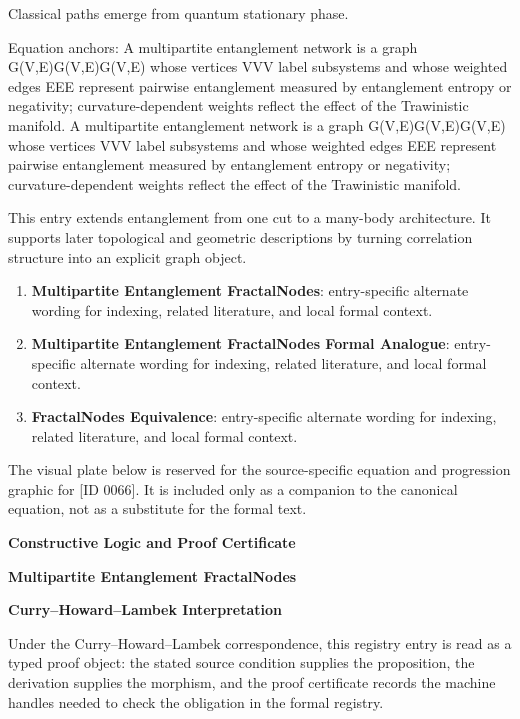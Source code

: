 Classical paths emerge from quantum stationary phase.

Equation anchors: A multipartite entanglement network is a graph G(V,E)G(V,E)G(V,E) whose vertices VVV label subsystems and whose weighted edges EEE represent pairwise entanglement measured by entanglement entropy or negativity; curvature-dependent weights reflect the effect of the Trawinistic manifold. A multipartite entanglement network is a graph G(V,E)G(V,E)G(V,E) whose vertices VVV label subsystems and whose weighted edges EEE represent pairwise entanglement measured by entanglement entropy or negativity; curvature-dependent weights reflect the effect of the Trawinistic manifold.

This entry extends entanglement from one cut to a many-body architecture. It supports later topological and geometric descriptions by turning correlation structure into an explicit graph object.
\endgroup

\begingroup\footnotesize\sloppy
\begin{enumerate}[leftmargin=1.35em,itemsep=1pt,topsep=1pt,parsep=0pt]
\item \textbf{Multipartite Entanglement FractalNodes}: entry-specific alternate wording for indexing, related literature, and local formal context.
\item \textbf{Multipartite Entanglement FractalNodes Formal Analogue}: entry-specific alternate wording for indexing, related literature, and local formal context.
\item \textbf{FractalNodes Equivalence}: entry-specific alternate wording for indexing, related literature, and local formal context.
\end{enumerate}
\endgroup

\begingroup\footnotesize\sloppy
The visual plate below is reserved for the source-specific equation and progression graphic for [ID 0066]. It is included only as a companion to the canonical equation, not as a substitute for the formal text.
\par\endgroup
\ifTZPDarkEdition
{}
\fi

\clearpage
\begingroup\tzpsupportsetup
\noindent\textbf{\fontsize{10.8pt}{12.8pt}\selectfont [ID 0066] Constructive Logic and Proof Certificate}\par
\noindent\textbf{\fontsize{10pt}{12pt}\selectfont Multipartite Entanglement FractalNodes}\par
\vspace{0.45em}
\begingroup
\footnotesize
\setlength{\parskip}{0.22em}
\setlength{\parindent}{0pt}
\noindent\textbf{Curry--Howard--Lambek Interpretation}\par
Under the Curry--Howard--Lambek correspondence, this registry entry is read as a typed proof
object: the stated source condition supplies the proposition, the derivation supplies the
morphism, and the proof certificate records the machine handles needed to check the obligation
in the formal registry.

